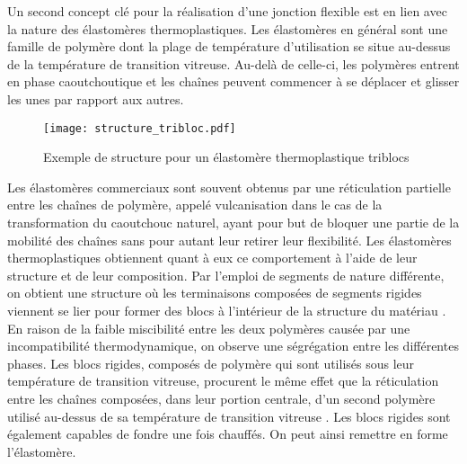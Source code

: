 \newcommand\setpolymerdelim[2]{\def\delimleft{#1}\def\delimright{#2}}
\def\makebraces[#1,#2]#3#4#5{%
	\edef\delimhalfdim{\the\dimexpr(#1+#2)/2}%
	\edef\delimvshift{\the\dimexpr(#1-#2)/2}%
	\chemmove{%
		\node[at=(#4),yshift=(\delimvshift)]
		{$\left\delimleft\vrule height\delimhalfdim depth\delimhalfdim
			width0pt\right.$};%
		\node[at=(#5),yshift=(\delimvshift)]
		{$\left.\vrule height\delimhalfdim depth\delimhalfdim
			width0pt\right\delimright_{\rlap{$\scriptstyle#3$}}$};}}
\setpolymerdelim()

Un second concept clé pour la réalisation d'une jonction flexible est en lien avec la nature des élastomères thermoplastiques. 
Les élastomères en général sont une famille de polymère dont la plage de température d'utilisation se situe au-dessus de la température de transition vitreuse. 
Au-delà de celle-ci, les polymères entrent en phase caoutchoutique et les chaînes peuvent commencer à se déplacer et glisser les unes par rapport aux autres. 

\begin{figure}[h]
	\centering
	\texttt{[image: structure\_tribloc.pdf]}
	\caption{Exemple de structure pour un élastomère thermoplastique triblocs}
	\label{fig:structure_tribloc}
\end{figure}

Les élastomères commerciaux sont souvent obtenus par une réticulation partielle entre les chaînes de polymère, appelé vulcanisation dans le cas de la transformation du  caoutchouc naturel, ayant pour but de bloquer une partie de la mobilité des chaînes sans pour autant leur retirer leur flexibilité. 
Les élastomères thermoplastiques obtiennent quant à eux ce comportement à l'aide de leur structure et de leur composition. 
Par l'emploi de segments de nature différente, on obtient une structure où les terminaisons composées de segments rigides viennent se lier pour former des blocs à l'intérieur de la structure du matériau \cite{Holden1969}. 
En raison de la faible miscibilité entre les deux polymères causée par une incompatibilité thermodynamique, on observe une ségrégation entre les différentes phases. 
Les blocs rigides, composés de polymère qui sont utilisés sous leur température de transition vitreuse, procurent le même effet que la réticulation entre les chaînes composées, dans leur portion centrale, d'un second polymère utilisé au-dessus de sa température de transition vitreuse \cite{Holden2002}. 
Les blocs rigides sont également capables de fondre une fois chauffés.
On peut ainsi remettre en forme l'élastomère. 

